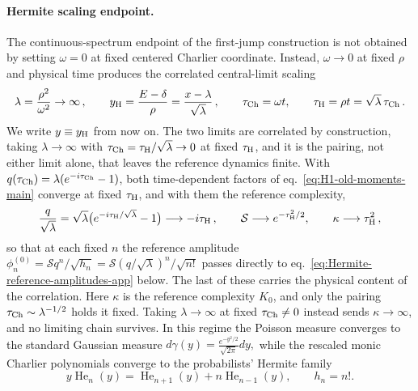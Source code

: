 \documentclass[a4paper,11pt]{article}
\def\dd{d}%
\def\ii{i}%
\def\ee{e}%
\theoremstyle{definition}
\theoremstyle{remark}
\newcommand{\dd}{\mathrm d}
\newcommand{\ii}{\mathrm i}
\newcommand{\ee}{\mathrm e}
\newcommand{\He}{\operatorname{He}}
\newcommand{\cS}{\mathcal S}
\begin{document}
\paragraph{Hermite scaling endpoint.}
The continuous-spectrum endpoint of the first-jump construction is not obtained by setting
$\omega=0$ at fixed centered Charlier coordinate. Instead, $\omega\to0$ at fixed $\rho$ and physical
time produces the correlated central-limit scaling
\begin{equation}
   \lambda=\frac{\rho^2}{\omega^2}\to\infty\,,
   \qquad
   y_{\rm H}=\frac{E-\delta}{\rho}=\frac{x-\lambda}{\sqrt{\lambda}}\,,
   \qquad
   \tau_{\rm Ch}=\omega t,\qquad
   \tau_{\rm H}=\rho t=\sqrt{\lambda}\,\tau_{\rm Ch}\,.
   \label{eq:Hermite-scaling-variables-app}
\end{equation}
We write $y\equiv y_{\rm H}$ from now on. The two limits are correlated by construction, taking $\lambda\to\infty$ with $\tau_{\rm Ch}=\tau_{\rm H}/\sqrt\lambda\to0$ at fixed $\tau_{\rm H}$, and it is the pairing, not either limit alone, that leaves the reference dynamics finite. With $q(\tau_{\rm Ch})=\lambda(\ee^{-\ii\tau_{\rm Ch}}-1)$, both time-dependent factors of eq.~\eqref{eq:H1-old-moments-main} converge at fixed $\tau_{\rm H}$, and with them the reference complexity,
\begin{equation}
   \frac{q}{\sqrt\lambda}
   =\sqrt\lambda\bigl(\ee^{-\ii\tau_{\rm H}/\sqrt\lambda}-1\bigr)
   \longrightarrow-\ii\tau_{\rm H}\,,
   \qquad
   \cS\longrightarrow\ee^{-\tau_{\rm H}^2/2},
   \qquad
   \kappa\longrightarrow\tau_{\rm H}^2\,,
   \label{eq:Hermite-scaling-moment-limits-app}
\end{equation}
so that at each fixed $n$ the reference amplitude
$\phi_n^{(0)}=\cS q^n/\sqrt{h_n}=\cS(q/\sqrt\lambda)^n/\sqrt{n!}$ passes directly to
eq.~\eqref{eq:Hermite-reference-amplitudes-app} below. The last of these carries the physical content
of the correlation. Here $\kappa$ is the reference complexity $K_0$, and only the pairing
$\tau_{\rm Ch}\sim\lambda^{-1/2}$ holds it fixed. Taking $\lambda\to\infty$ at fixed
$\tau_{\rm Ch}\ne0$ instead sends $\kappa\to\infty$, and no limiting chain survives. In this regime the Poisson measure converges to the standard Gaussian measure
$
   \dd\gamma(y)=\frac{\ee^{-y^2/2}}{\sqrt{2\pi}}\dd y,
$ 
while the rescaled monic Charlier polynomials converge to the probabilists' Hermite family
\begin{equation}
   y\He_n(y)=\He_{n+1}(y)+n\He_{n-1}(y),
   \qquad h_n=n!.
   \label{eq:Hermite-reference-recurrence-app}
\end{equation}
\end{document}
